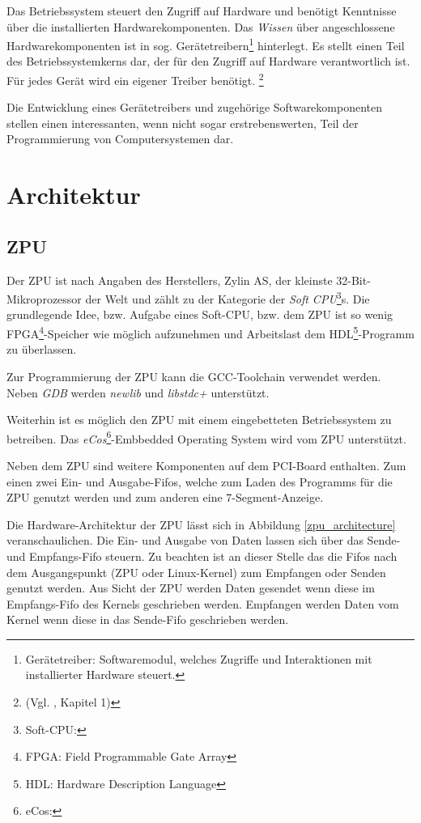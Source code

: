 \documentclass[11pt]{scrartcl}
\begin{document}
Das Betriebssystem steuert den Zugriff auf Hardware und benötigt Kenntnisse über die installierten Hardwarekomponenten. Das \textit{Wissen} über angeschlossene Hardwarekomponenten ist in sog. Gerätetreibern\footnote{Gerätetreiber: Softwaremodul, welches Zugriffe und Interaktionen mit installierter Hardware steuert.} hinterlegt. Es stellt einen Teil des Betriebssystemkerns dar, der für den Zugriff auf Hardware verantwortlich ist. Für jedes Gerät wird ein eigener Treiber benötigt. \footnote{(Vgl. \cite{ltp_book}, Kapitel 1)}

Die Entwicklung eines Gerätetreibers und zugehörige Softwarekomponenten stellen einen interessanten, wenn nicht sogar erstrebenswerten, Teil der Programmierung von Computersystemen dar.

\pagebreak

\section{Architektur}
 
\subsection{ZPU}


Der ZPU ist nach Angaben des Herstellers, Zylin AS, der kleinste 32-Bit-Mikroprozessor der Welt und zählt zu der Kategorie der \textit{Soft CPU}\footnote{Soft-CPU:}s. Die grundlegende Idee, bzw. Aufgabe eines Soft-CPU, bzw. dem ZPU ist so wenig FPGA\footnote{FPGA: Field Programmable Gate Array}-Speicher wie möglich aufzunehmen und Arbeitslast dem HDL\footnote{HDL: Hardware Description Language}-Programm zu überlassen.

Zur Programmierung der ZPU kann die GCC-Toolchain verwendet werden. Neben \textit{GDB} werden \textit{newlib} und \textit{libstdc+} unterstützt.

Weiterhin ist es möglich den ZPU mit einem eingebetteten Betriebssystem zu betreiben. Das \textit{eCos}\footnote{eCos:}-Embbedded Operating System wird vom ZPU unterstützt. 

Neben dem ZPU sind weitere Komponenten auf dem PCI-Board enthalten. Zum einen zwei Ein- und Ausgabe-Fifos, welche zum Laden des Programms für die ZPU genutzt werden und zum anderen eine 7-Segment-Anzeige.

Die Hardware-Architektur der ZPU lässt sich in Abbildung \ref{zpu_architecture} veranschaulichen. 
Die Ein- und Ausgabe von Daten lassen sich über das Sende- und Empfangs-Fifo steuern. Zu beachten ist an dieser Stelle das die Fifos nach dem Ausgangspunkt (ZPU oder Linux-Kernel) zum Empfangen oder Senden genutzt werden. Aus Sicht der ZPU werden Daten gesendet wenn diese im Empfangs-Fifo des Kernels geschrieben werden. Empfangen werden Daten vom Kernel wenn diese in das Sende-Fifo geschrieben werden. 
\end{document}
